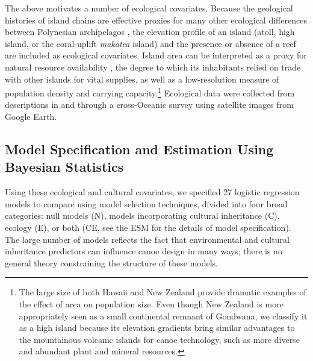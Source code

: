 \documentclass[11pt]{article}
\begin{document}
The above motivates a number of ecological covariates. Because the geological histories of island chains are effective proxies for many other ecological differences between Polynesian archipelagos \citep{Kirch2000:Road}, the elevation profile of an island (atoll, high island, or the coral-uplift \textit{makatea} island) and the presence or absence of a reef are included as ecological covariates. Island area can be interpreted as a proxy for natural resource availability \citep{Banack1991ethnobotany}, the degree to which its inhabitants relied on trade with other islands for vital supplies, as well as a low-resolution measure of population density and carrying capacity.\footnote{The large size of both Hawaii and New Zealand provide dramatic examples of the effect of area on population size. Even though New Zealand is more appropriately seen as a small continental remnant of Gondwana, we classify it as a high island because its elevation gradients bring similar advantages to the mountainous volcanic islands for canoe technology, such as more diverse and abundant plant and mineral resources.}  Ecological data were collected from descriptions in \cite{MuellerDombois1998vegetation} and through a cross-Oceanic survey using satellite images from Google Earth.

\subsection{Model Specification and Estimation Using Bayesian Statistics}

Using these ecological and cultural covariates, we specified 27 logistic regression models to compare using model selection techniques, divided into four broad categories: null models (N), models incorporating cultural inheritance (C), ecology (E), or both (CE, see the ESM for the details of model specification). The large number of models reflects the fact that environmental and cultural inheritance predictors can influence canoe design in many ways; there is no general theory constraining the structure of these models.
\end{document}
